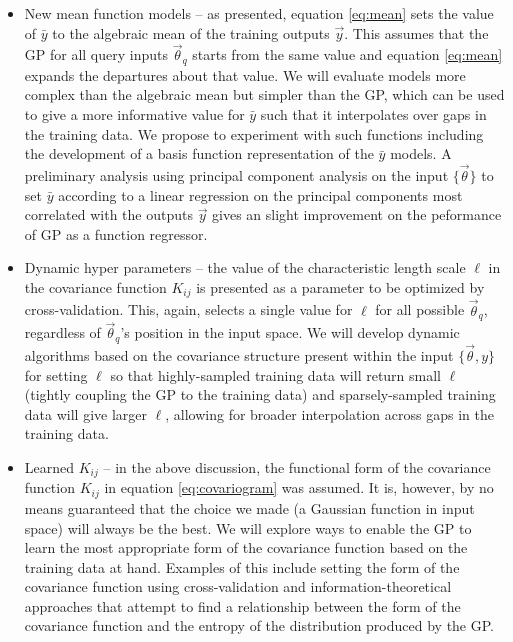 \documentclass[prd,nofootbib,floatfix,11pt,tightenlines]{revtex4}
\begin{document}
\begin{itemize}
\item New mean function models -- as presented,
equation \ref{eq:mean} sets the value of $\bar{y}$ to the algebraic mean of the
training outputs $\vec{y}$.  This assumes that the GP for all 
query inputs $\vec{\theta}_q$
starts from the same value and equation \ref{eq:mean} expands the
departures about that value.  
We will evaluate models more complex than the algebraic
mean but simpler than the GP, which can be used to give a more informative value
for $\bar{y}$ such that it interpolates over gaps in the training data.  We propose
to experiment with such functions including the development of a basis
function representation of the $\bar{y}$ models. A preliminary analysis using
 principal component
analysis on the input $\{\vec{\theta}\}$ to set $\bar{y}$ according to a linear
regression on the principal components most correlated with the outputs $\vec{y}$
gives an slight improvement on the peformance of
GP as a function regressor.

\item Dynamic hyper parameters -- the value of the characteristic
length scale $\ell$ in the covariance function $K_{ij}$ is presented
as a parameter to be optimized by cross-validation.  This, again, selects a
single value for $\ell$ for all possible $\vec{\theta}_q$, regardless of
$\vec{\theta}_q$'s position in the input space.  We will develop 
dynamic algorithms based on the covariance
structure present within the input $\{\vec{\theta},y\}$  
for setting $\ell$ so that highly-sampled 
training data will
return small $\ell$ (tightly coupling the GP to the training data) and
sparsely-sampled training data will give larger $\ell$, allowing for broader
interpolation across gaps in the training data.

\item Learned $K_{ij}$ -- in the above discussion, the functional form of
the covariance function
$K_{ij}$ in equation \ref{eq:covariogram}
was assumed.  
It is, however, by no means guaranteed that the choice we made (a Gaussian
function in input space) will always be the best.  
We will explore ways
to enable the GP to learn the most appropriate form of 
the covariance function
based on the training data at hand. Examples of this include setting the
form of the covariance function
using cross-validation and information-theoretical
approaches that attempt to find a relationship between the form of the covariance
function and the entropy of the distribution produced by the GP.
\end{itemize}
\end{document}
